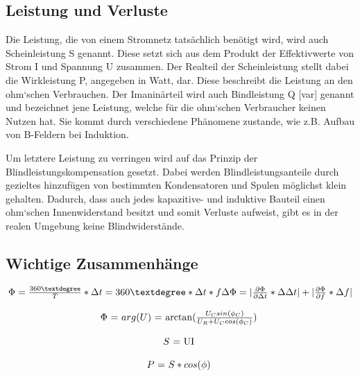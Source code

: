 \documentclass[12pt,a4paper,twoside]{article}
\begin{document}
\subsection{Leistung und Verluste}

Die Leistung, die von einem Stromnetz tatsächlich benötigt wird, wird auch Scheinleistung S genannt. Diese setzt sich aus dem Produkt der Effektivwerte von Strom I und Spannung U zusammen.
Der Realteil der Scheinleistung stellt dabei die Wirkleistung P, angegeben in Watt, dar. Diese beschreibt die Leistung an den ohm`schen Verbrauchen. Der Imaninärteil wird auch Bindleistung Q [var] genannt und bezeichnet jene Leistung, welche für die ohm`schen Verbraucher keinen Nutzen hat.
Sie kommt durch verschiedene Phänomene zustande, wie z.B. Aufbau von B-Feldern bei Induktion. \newline

\noindent
Um letztere Leistung zu verringen wird auf das Prinzip der Blindleistungskompensation gesetzt. Dabei werden Blindleistungsanteile durch gezieltes hinzufügen von bestimmten Kondensatoren und Spulen möglichst klein gehalten. Dadurch, dass auch jedes kapazitive- und induktive Bauteil einen ohm`schen Innenwiderstand besitzt und somit Verluste aufweist, gibt es in der realen Umgebung keine Blindwiderstände. 



 \subsection{Wichtige Zusammenhänge}

 \begin{equation}
    \label{eq:Phasenversatz}
    \centerline{$\Phi = \frac{360°}{T}*\Delta t = 360° * \Delta t * f$ \\ $\Delta \Phi = \vert \frac{\partial \Phi}{\partial \Delta t} * \Delta \Delta t \vert + \vert \frac{\partial \Phi}{\partial f} * \Delta f \vert $}
\end{equation}

\begin{equation}
    \label{eq:Phasenversatz_Kreise}
    \centerline{$\Phi $ = $arg(U)$ = $\arctan(\frac{U_{C}sin(\phi_C)}{U_R + U_{C}cos(\phi_C)}$) }
\end{equation}

\begin{equation}
    \label{eq:Scheinleistung}
    \centerline{$S $ = UI }
\end{equation}

\begin{equation}
    \label{eq:Wirkleistung}
    \centerline{$P $ = $S*cos(\phi)$ }
\end{equation}
\end{document}
